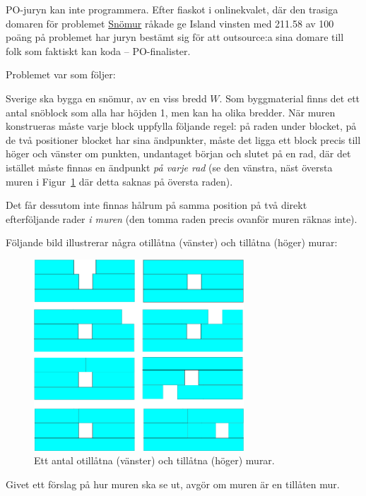PO-juryn kan inte programmera. Efter fiaskot i onlinekvalet, där den trasiga domaren för problemet \href{https://pokval16.kattis.com/problems/pokval16.snomur}{Snömur} råkade ge Island vinsten med 211.58 av 100 poäng på problemet har juryn bestämt sig för att outsource:a sina domare till folk som faktiskt kan koda -- PO-finalister.

Problemet var som följer:

Sverige ska bygga en snömur, av en viss bredd $W$.
Som byggmaterial finns det ett antal snöblock som alla har höjden 1, men kan ha olika bredder.
När muren konstrueras måste varje block uppfylla följande regel: på raden under blocket,
på de två positioner blocket har sina ändpunkter, måste det ligga ett block precis till höger och vänster om punkten,
undantaget början och slutet på en rad, där det istället måste finnas en ändpunkt \emph{på varje rad} (se den vänstra, näst översta muren i Figur~\ref{fig:sample} där detta saknas på översta raden).

Det får dessutom inte finnas hålrum på samma position på två direkt efterföljande rader \emph{i muren} (den tomma raden
precis ovanför muren räknas inte).

Följande bild illustrerar några otillåtna (vänster) och tillåtna (höger) murar:

\begin{figure}[h]
	\centering
	\includegraphics[width=0.7\textwidth]{mur.png}
	\caption{Ett antal otillåtna (vänster) och tillåtna (höger) murar.}
  \label{fig:sample}
\end{figure}

Givet ett förslag på hur muren ska se ut, avgör om muren är en tillåten mur.


